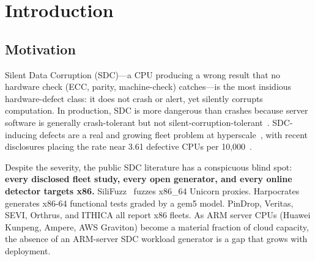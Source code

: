 \documentclass[sigplan,review,anonymous]{acmart}
\begin{document}

\maketitle

\section{Introduction}
\label{sec:intro}

\subsection{Motivation}
Silent Data Corruption (SDC)---a CPU producing a wrong result that no hardware check (ECC, parity, machine-check) catches---is the most insidious hardware-defect class: it does not crash or alert, yet silently corrupts computation. In production, SDC is more dangerous than crashes because server software is generally crash-tolerant but not silent-corruption-tolerant~\cite{hochschild_hotos21}. SDC-inducing defects are a real and growing fleet problem at hyperscale~\cite{dixit2021_sdc,wang_sosp23}, with recent disclosures placing the rate near 3.61 defective CPUs per 10{,}000~\cite{wang_sosp23}.

Despite the severity, the public SDC literature has a conspicuous blind spot: \textbf{every disclosed fleet study, every open generator, and every online detector targets x86.} SiliFuzz~\cite{silifuzz} fuzzes x86\_64 Unicorn proxies. Harpocrates~\cite{harpocrates_isca24,harpocrates_micro26} generates x86-64 functional tests graded by a gem5 model. PinDrop, Veritas, SEVI, Orthrus, and ITHICA all report x86 fleets. As ARM server CPUs (Huawei Kunpeng, Ampere, AWS Graviton) become a material fraction of cloud capacity, the absence of an ARM-server SDC workload generator is a gap that grows with deployment.
\end{document}
